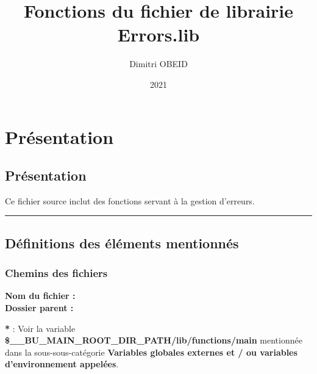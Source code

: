 \documentclass[a4paper,10pt]{article}
\title{\color{sec1}Fonctions du fichier de librairie \color{path}Errors.lib}\color{text}
\author{Dimitri OBEID}
\date{2021}
\begin{document}
 \maketitle
 \tableofcontents
 \newpage

\color{sec1}
\section{Présentation}\color{text}

\color{sec2}
\subsection{Présentation}\color{text}

\begin{justify}
    Ce fichier source inclut des fonctions servant à la gestion d'erreurs.
\end{justify}




\color{sec2}\par\noindent\rule{\textwidth}{0.4pt}\color{text}

\color{sec2}
\subsection{Définitions des éléments mentionnés}\color{text}

\color{sec3}
\subsubsection{Chemins des fichiers}\color{text}

\textbf{Nom du fichier : \color{path}}\\[1\baselineskip]

\textbf{Dossier parent : \color{path}}\\[1\baselineskip]

\begin{justify}
    \textbf{*} : Voir la variable \textbf{\color{vars}\$\_\_BU\_MAIN\_ROOT\_DIR\_PATH\color{path}/lib/functions/main} mentionnée dans la sous-sous-catégorie \textbf{\color{sec3}Variables globales externes et / ou variables d'environnement appelées}.
\end{justify}

\end{document}
